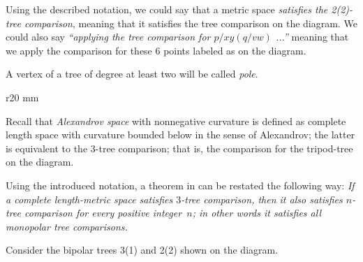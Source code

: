 Using the described notation, we could say that a metric space \emph{satisfies the 2(2)-tree comparison},  meaning that it satisfies the tree comparison on the diagram.
We could also say \emph{``applying the tree comparison for $p/xy(q/vw)$ ...''} meaning that we apply the comparison for these 6 points labeled as on the diagram.

A vertex of a tree of degree at least two will be called \emph{pole}.

\hide
\begin{wrapfigure}{r}{20 mm}
\end{wrapfigure}
\unhide

Recall that \emph{Alexandrov space} with nonnegative curvature is defined as complete length space with curvature bounded below in the sense of Alexandrov;
the latter is equivalent to the 3-tree comparison; that is, the comparison for the tripod-tree on the diagram. 

Using the introduced notation, a theorem in \cite{AKP} can be restated the following way: \emph{If a complete length-metric space satisfies $3$-tree comparison, then it also satisfies $n$-tree comparison for every positive integer~$n$; in other words it satisfies all monopolar tree comparisons.}

Consider the bipolar trees 3(1) and 2(2) shown on the diagram.

